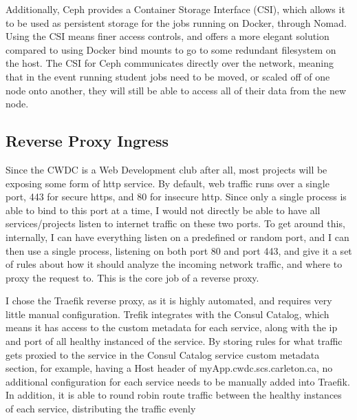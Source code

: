 \documentclass{article}
\begin{document}
Additionally, Ceph provides a Container Storage Interface (CSI), which allows it to be used as persistent storage for the jobs running on Docker, through Nomad. Using the CSI means finer access controls, and offers a more elegant solution compared to using Docker bind mounts to go to some redundant filesystem on the host. The CSI for Ceph communicates directly over the network, meaning that in the event running student jobs need to be moved, or scaled off of one node onto another, they will still be able to access all of their data from the new node.

\subsection{Reverse Proxy Ingress}
Since the CWDC is a Web Development club after all, most projects will be exposing some form of http service. By default, web traffic runs over a single port, 443 for secure https, and 80 for insecure http. Since only a single process is able to bind to this port at a time, I would not directly be able to have all services/projects listen to internet traffic on these two ports. To get around this, internally, I can have everything listen on a predefined or random port, and I can then use a single process, listening on both port 80 and port 443, and give it a set of rules about how it should analyze the incoming network traffic, and where to proxy the request to. This is the core job of a reverse proxy.

I chose the Traefik reverse proxy, as it is highly automated, and requires very little manual configuration. Trefik integrates with the Consul Catalog, which means it has access to the custom metadata for each service, along with the ip and port of all healthy instanced of the service. By storing rules for what traffic gets proxied to the service in the Consul Catalog service custom metadata section, for example, having a Host header of myApp.cwdc.scs.carleton.ca, no additional configuration for each service needs to be manually added into Traefik. In addition, it is able to round robin route traffic between the healthy instances of each service, distributing the traffic evenly
\end{document}
